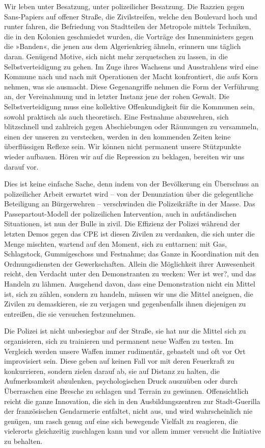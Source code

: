 Wir leben unter Besatzung, unter polizeilicher Besatzung. Die
Razzien gegen Sans-Papiers auf offener Straße, die Zivilstreifen,
welche den Boulevard hoch und runter fahren, die Befriedung von
Stadtteilen der Metropole mittels Techniken, die in den Kolonien
geschmiedet wurden, die Vorträge des Innenministers gegen die
»Banden«, die jenen aus dem Algerienkrieg ähneln, erinnern uns
täglich daran. Genügend Motive, sich nicht mehr zerquetschen zu
lassen, in die Selbstverteidigung zu gehen.
Im Zuge ihres Wachsens und Ausstrahlens wird eine Kommune nach und
nach mit Operationen der Macht konfrontiert, die aufs Korn nehmen,
was sie ausmacht. Diese Gegenangriffe nehmen die Form der
Verführung an, der Vereinahmung und in letzter Instanz jene der
rohen Gewalt. Die Selbstverteidigung muss eine kollektive
Offenkundigkeit für die Kommunen sein, sowohl praktisch als auch
theoretisch. Eine Festnahme abzuwehren, sich blitzschnell und
zahlreich gegen Abschiebungen oder Räumungen zu versammeln, einen
der unseren zu verstecken, werden in den kommenden Zeiten keine
überflüssigen Reflexe sein. Wir können nicht permanent unsere
Stützpunkte wieder aufbauen. Hören wir auf die Repression zu
beklagen, bereiten wir uns darauf vor.

Dies ist keine einfache Sache, denn indem von der Bevölkerung ein
Überschuss an polizeilicher Arbeit erwartet wird – von der
Denunziation über die gelegentliche Beteiligung an Bürgerwehren –
verschwinden die Polizeikräfte in der Masse. Das
Passepartout-Modell der polizeilichen Intervention, auch in
aufständischen Situationen, ist nun der Bulle in zivil. Die
Effizienz der Polizei während der letzten Demos gegen das CPE ist
diesen Zivilen zu verdanken, die sich unter die Menge mischten,
wartend auf den Moment, sich zu enttarnen: mit Gas, Schlagstock,
Gummigeschoss und Festnahme; das Ganze in Koordination mit den
Ordnungsdiensten der Gewerkschaften. Allein die Möglichkeit ihrer
Anwesenheit reicht, den Verdacht unter den Demonstranten zu wecken:
Wer ist wer?, und das Handeln zu lähmen. Ausgehend davon, dass eine
Demonstration nicht ein Mittel ist, sich zu zählen, sondern zu
handeln, müssen wir uns die Mittel aneignen, die Zivilen zu
demaskieren, sie zu verjagen und gegenbenfalls ihnen diejenigen zu
entreißen, die sie versuchen festzunehmen.

Die Polizei ist nicht unbesiegbar auf der Straße, sie hat nur die
Mittel sich zu organisieren, sich zu trainieren und permanent neue
Waffen zu testen. Im Vergleich werden unsere Waffen immer
rudimentär, gebastelt und oft vor Ort improvisiert sein. Diese
geben auf keinen Fall vor mit deren Feuerkraft zu konkurrieren,
sondern zielen darauf ab, sie auf Distanz zu halten, die
Aufmerksamkeit abzulenken, psychologischen Druck auszuüben oder
durch Überraschen eine Bresche zu schlagen und Terrain zu gewinnen.
Offensichtlich reicht die ganze Innovation, die sich in den
Ausbildungszentren zur Stadt-Guerilla der französischen Gendarmerie
entfaltet, nicht aus, und wird wahrscheinlich nie genügen, um rasch
genug auf eine sich bewegende Vielfalt zu reagieren, die vielerorts
gleichzeitig zuschlagen kann und vor allem immer versucht die
Initiative zu behalten.

